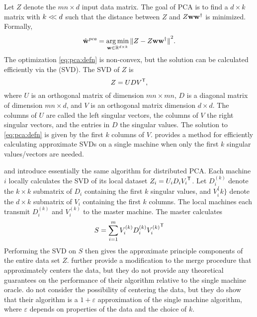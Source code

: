 \documentclass[thesis.tex]{subfiles}
\newcommand{\wpca}{\hat\w^\textit{pca}}
\begin{document}
Let $Z$ denote the $mn\times d$ input data matrix.
The goal of PCA is to find a $d\times k$ matrix with $k <\!\!< d$ such that the distance between $Z$ and $Z\mathbf w{\mathbf w}^{\mathsf{\dagger}}$ is minimized.
Formally, 
\begin{equation}
    \label{eq:pca:defn}
    \wpca = \argmin_{\w\in\R^{d\times k}} \ltwo{Z - Z\w\pinv\w}^2
    .
\end{equation}
The optimization \eqref{eq:pca:defn} is non-convex, 
but the solution can be calculated efficiently via the  (SVD). 
The SVD of $Z$ is
\begin{equation}
    Z = UD{V}^{\mathsf{T}}
    ,
\end{equation}
where $U$ is an orthogonal matrix of dimension $mn\times mn$, 
$D$ is a diagonal matrix of dimension $mn\times d$, 
and $V$ is an orthogonal matrix dimension $d\times d$.
The columns of $U$ are called the left singular vectors, 
the columns of $V$ the right singular vectors,
and the entries in $D$ the singular values.
The solution to \eqref{eq:pca:defn} is given by the first $k$ columns of $V$.
\citet{halko2011finding} provides a method for efficiently calculating approximate SVDs on a single machine when only the first $k$ singular values/vectors are needed.

\cite{qu2002principal} and \cite{liang2013distributed} introduce essentially the same algorithm for distributed PCA.
Each machine $i$ locally calculates the SVD of its local dataset $Z_i = U_i D_i {V_i}^{\mathsf{T}}$.
Let $D_i^{(k)}$ denote the $k\times k$ submatrix of $D_i$ containing the first $k$ singular values,
and $V_i^\{k\}$ denote the $d\times k$ submatrix of $V_i$ containing the first $k$ columns.
The local machines each transmit $D_i^{(k)}$ and $V_i^{(k)}$ to the master machine.
The master calculates 
\begin{equation}
    S = \sum_{i=1}^m V_i^{(k)}D_i^{(k)}{V_i^{(k)}}^{\mathsf{T}}
\end{equation}
Performing the SVD on $S$ then gives the approximate principle components of the entire data set $Z$.
\cite{qu2002principal} further provide a modification to the merge procedure that approximately centers the data,
but they do not provide any theoretical guarantees on the performance of their algorithm relative to the single machine oracle.
\cite{liang2013distributed} do not consider the possibility of centering the data,
but they do show that their algorithm is a $1+\varepsilon$ approximation of the single machine algorithm, where $\varepsilon$ depends on properties of the data and the choice of $k$.
\end{document}
